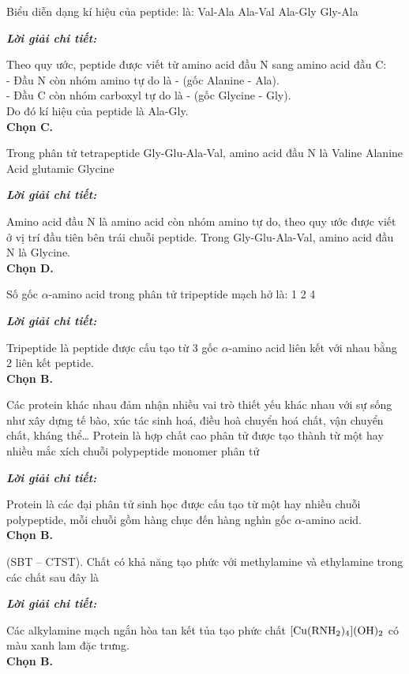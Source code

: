 \documentclass[11pt,a4paper]{article}
\def\loigiai#1{
\par\begingroup\color{blue!80!black}\small
\noindent\textbf{\textit{Lời giải chi tiết:}}\par
#1\par\endgroup}
\begin{document}
\begin{ex}
Biểu diễn dạng kí hiệu của peptide:  là:
\choice
{Val-Ala}
{Ala-Val}
{\True Ala-Gly}
{Gly-Ala}
\loigiai{
Theo quy ước, peptide được viết từ amino acid đầu N sang amino acid đầu C:\\
- Đầu N còn nhóm amino tự do là -\ce{CH(CH3)NH2} (gốc Alanine - Ala).\\
- Đầu C còn nhóm carboxyl tự do là \ce{HOOC-CH2-NH}- (gốc Glycine - Gly).\\
Do đó kí hiệu của peptide là Ala-Gly.\\
\textbf{Chọn C.}}
\end{ex}

\begin{ex}
Trong phân tử tetrapeptide Gly-Glu-Ala-Val, amino acid đầu N là
\choice
{Valine}
{Alanine}
{Acid glutamic}
{\True Glycine}
\loigiai{
Amino acid đầu N là amino acid còn nhóm amino tự do, theo quy ước được viết ở vị trí đầu tiên bên trái chuỗi peptide. Trong Gly-Glu-Ala-Val, amino acid đầu N là Glycine.\\
\textbf{Chọn D.}}
\end{ex}

\begin{ex}
Số gốc $\alpha$-amino acid trong phân tử tripeptide mạch hở là:
\choice
{1}
{}
{2}
{4}
\loigiai{
Tripeptide là peptide được cấu tạo từ 3 gốc $\alpha$-amino acid liên kết với nhau bằng 2 liên kết peptide.\\
\textbf{Chọn B.}}
\end{ex}

\begin{ex}
Các protein khác nhau đảm nhận nhiều vai trò thiết yếu khác nhau với sự sống như xây dựng tế bào, xúc tác sinh hoá, điều hoà chuyển hoá chất, vận chuyển chất, kháng thể\dots{} Protein là hợp chất cao phân tử được tạo thành từ một hay nhiều
\choice
{mắc xích}
{\True chuỗi polypeptide}
{monomer}
{phân tử}
\loigiai{
Protein là các đại phân tử sinh học được cấu tạo từ một hay nhiều chuỗi polypeptide, mỗi chuỗi gồm hàng chục đến hàng nghìn gốc $\alpha$-amino acid.\\
\textbf{Chọn B.}}
\end{ex}



\begin{ex}
(SBT -- CTST). Chất có khả năng tạo phức với methylamine và ethylamine trong các chất sau đây là
\choice
{}
{\True {}}
{}
{}
\loigiai{
Các alkylamine mạch ngắn hòa tan kết tủa \ce{Cu(OH)2} tạo phức chất $\ce{[Cu(RNH2)4](OH)2}$ có màu xanh lam đặc trưng.\\
\textbf{Chọn B.}}
\end{ex}
\end{document}
